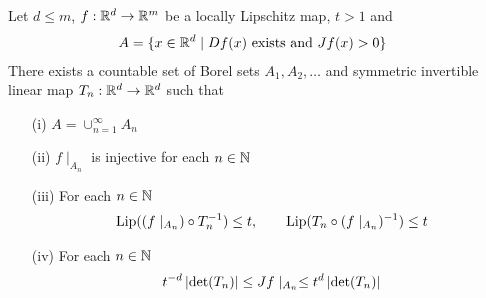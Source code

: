 \begin{lem}\label{AreaFormulaLipschitz:FunctionBounds}Let $d \leq m$, $f : \mathbb{R}^d \to \mathbb{R}^m$ be a locally Lipschitz map, $t>1$ and
\begin{align*}
A &= \lbrace x \in \mathbb{R}^d \mid Df(x) \text{ exists and } Jf(x) > 0\rbrace
\end{align*}
There exists a countable set of Borel sets $A_1, A_2, \dotsc$ and symmetric invertible linear map $T_n : \mathbb{R}^d \to \mathbb{R}^d$ such that 
\begin{itemize}
\item[(i)] $A = \cup_{n=1}^\infty A_n$
\item[(ii)] $f \mid_{A_n}$ is injective for each $n \in \mathbb{N}$
\item[(iii)] For each $n \in \mathbb{N}$
\begin{align}\label{eq:AreaFormulaLipschitz:LipschitzConstants}
\operatorname*{Lip}((f \mid_{A_n}) \circ T_n^{-1}) \leq t, \qquad \operatorname*{Lip}(T_n \circ (f
  \mid_{A_n})^{-1}) \leq t
\end{align}
\item[(iv)] For each $n \in \mathbb{N}$
\begin{align}\label{eq:AreaFormulaLipschitz:JacobianBounds}
t^{-d} \left \vert \det(T_n) \right \vert \leq Jf\mid_{A_n} \leq t^{d} \left \vert \det(T_n) \right \vert 
\end{align}
\end{itemize}
\end{lem}
